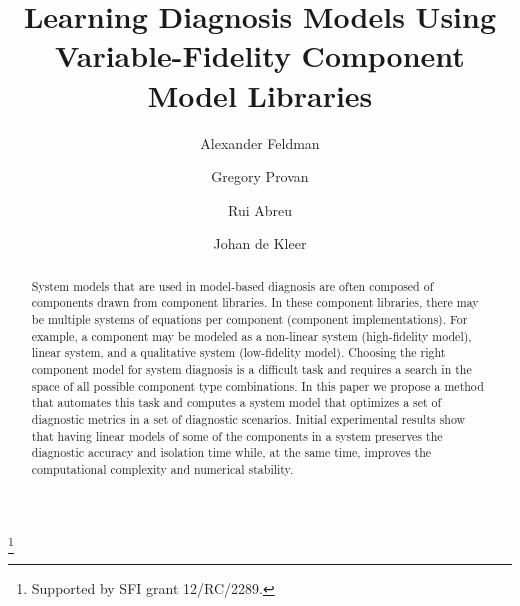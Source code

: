 \documentclass{ifacconf}
\begin{document}
%
\begin{frontmatter}
%
\title{Learning Diagnosis Models Using Variable-Fidelity Component Model Libraries}
%
\thanks[footnoteinfo]{Supported by SFI grant 12/RC/2289.}
%
\author[First]{Alexander Feldman}
\author[Second]{Gregory Provan}
\author[First]{Rui Abreu}
\author[First]{Johan de Kleer}
%
\address[First]{PARC Inc., Palo Alto, CA 94304, USA\\(e-mail: \{afeldman,dekleer,rui\}@parc.com)}
\address[Second]{Department of Computer Science, University College Cork, Cork, Ireland (e-mail: g.provan@cs.ucc.ie).}
%
\begin{abstract}
%
System models that are used in model-based diagnosis are often
composed of components drawn from component libraries. In these component
libraries, there may be multiple systems of equations per component
(component implementations). For example, a component may be modeled
as a non-linear system (high-fidelity model), linear system, and a
qualitative system (low-fidelity model). Choosing the right component
model for system diagnosis is a difficult task and requires a search
in the space of all possible component type combinations. In this
paper we propose a method that automates this task and computes a
system model that optimizes a set of diagnostic metrics in a set of
diagnostic scenarios. Initial experimental results show that having
linear models of some of the components in a system preserves the
diagnostic accuracy and isolation time while, at the same time,
improves the computational complexity and numerical stability.
%
\end{abstract}
\end{frontmatter}
%






%

%
\end{document}
